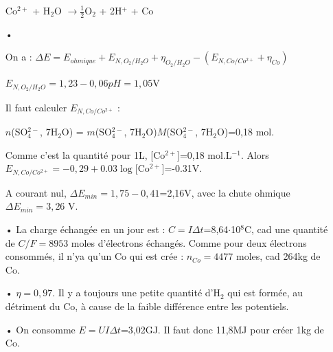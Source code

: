 \documentclass{report}
\begin{document}
\begin{itemize}
	 Co$^{2+}$ + H$_2$O $\longrightarrow\frac{1}{2}$O$_2$ + 2H$^+$ + Co
	 \item[•] 
	 
	 On a : $\Delta E = E_{ohmique} + E_{N, O_2/H_2O} + \eta_{O_2/H_2O} - ( E_{N,Co/Co^{2+}} + \eta_{Co})$
	 
	$E_{N, O_2/H_2O}=1,23-0,06pH=1,05$V
	 
	 Il faut calculer $E_{N,Co/Co^{2+}}$ :
	 
	 $n$(SO$_{4}^{2-}$, 7H$_2$O) = $m$(SO$_{4}^{2-}$, 7H$_2$O)$M$(SO$_{4}^{2-}$, 7H$_2$O)=0,18 mol.
	 
	 Comme c'est la quantité pour 1L, [Co$^{2+}$]=0,18 mol.L$^{-1}$. Alors $E_{N,Co/Co^{2+}}=-0,29+0.03\log$[Co$^{2+}$]=-0.31V.
	 
	  A courant nul, $\Delta E_{min}=1,75-0,41$=2,16V, avec la chute ohmique $\Delta E_{min}=3,26$ V.
	  
	  \item[•] La charge échangée en un jour est : $C=I\Delta t$=8,64$\cdot$10$^8$C, cad une quantité de $C/F=8953$ moles d'électrons échangés. Comme pour deux électrons consommés, il n'ya qu'un Co qui est crée :
	  $n_{Co}=4477$ moles, cad 264kg de Co.
	  \item[•] $\eta=0,97$. Il y a toujours une petite quantité d'H$_2$ qui est formée, au détriment du Co, à cause de la faible différence entre les potentiels.
	  \item[•] On consomme $E= UI\Delta t$=3,02GJ. Il faut donc 11,8MJ pour créer 1kg de Co.
\end{itemize}
\end{document}
